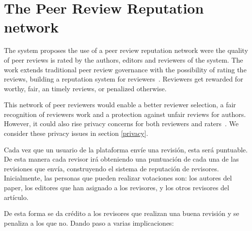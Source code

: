 \section{The Peer Review Reputation network}
\label{reputation}

The system proposes the use of a peer review reputation network were the quality
of peer reviews is rated by the authors, editors and reviewers of the system.
The work extends traditional peer review governance with the possibility of
rating the reviews, building a reputation system for
reviewers~\cite{resnick2000reputation}. Reviewers get rewarded for worthy, fair,
an timely reviews, or penalized otherwise.

This network of peer reviewers would enable a better reviewer selection, a fair
recognition of reviewers work and a protection against unfair reviews for
authors. However, it could also rise privacy concerns for both reviewers and
raters~\cite{van1999effect,schaub2016trustless}. We consider these privacy
issues in section \ref{privacy}.


Cada vez que un usuario de la plataforma envíe una revisión, esta será
puntuable. De esta manera cada revisor irá obteniendo una puntuación de cada una
de las revisiones que envía, construyendo el sistema de reputación de revisores.
Inicialmente, las personas que pueden realizar votaciones son: los autores del
paper, los editores que han asignado a los revisores, y los otros revisores del
artículo.

De esta forma se da crédito a los revisores que realizan una buena revisión y se
penaliza a los que no. Dando paso a varias implicaciones:

